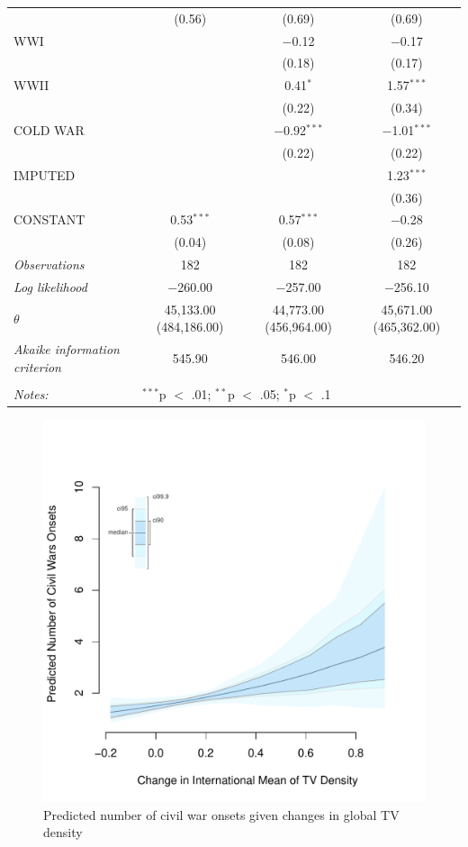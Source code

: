 \documentclass[11pt,article,oneside]{memoir}
\makeatletter
\def\maxwidth{\ifdim\Gin@nat@width>\linewidth\linewidth
\else\Gin@nat@width\fi}
\let\Oldincludegraphics\includegraphics
\renewcommand{\includegraphics}[1]{\Oldincludegraphics[width=\maxwidth]{#1}}
\makeatother
\begin{document}
\begin{table}[!htbp]
\begin{tabular}{@{\extracolsep{5pt}}lccc}
  & (0.56) & (0.69) & (0.69) \\ 
  WWI &  & $-$0.12 & $-$0.17 \\ 
  &  & (0.18) & (0.17) \\ 
  WWII &  & 0.41$^{*}$ & 1.57$^{***}$ \\ 
  &  & (0.22) & (0.34) \\ 
  COLD WAR &  & $-$0.92$^{***}$ & $-$1.01$^{***}$ \\ 
  &  & (0.22) & (0.22) \\ 
  IMPUTED &  &  & 1.23$^{***}$ \\ 
  &  &  & (0.36) \\ 
  CONSTANT & 0.53$^{***}$ & 0.57$^{***}$ & $-$0.28 \\ 
  & (0.04) & (0.08) & (0.26) \\ 
 \textit{Observations} & 182 & 182 & 182 \\ 
\textit{Log likelihood} & $-$260.00 & $-$257.00 & $-$256.10 \\ 
$\theta$ & 45,133.00  (484,186.00) & 44,773.00  (456,964.00) & 45,671.00  (465,362.00) \\ 
\textit{Akaike information criterion} & 545.90 & 546.00 & 546.20 \\ 
\hline \\[-1.8ex] 
\textit{Notes:} & \multicolumn{3}{l}{$^{***}$p $<$ .01; $^{**}$p $<$ .05; $^{*}$p $<$ .1} \\ 
\end{tabular} 
\end{table}

\clearpage

\begin{figure} 
\includegraphics{figure/dtv_effect.pdf} 
\caption{Predicted number of civil war onsets given changes in global TV density} 
\label{myFigur} 
\end{figure}
\end{document}
